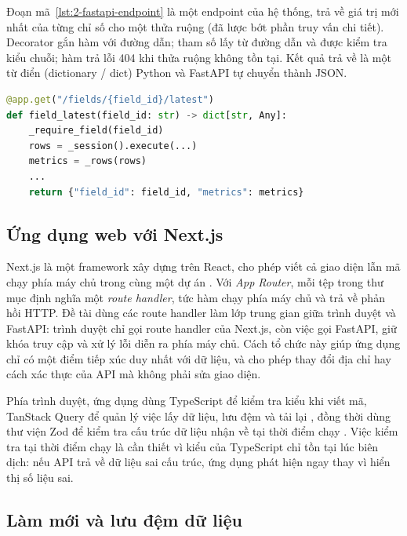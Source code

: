 Đoạn mã~\ref{lst:2-fastapi-endpoint} là một endpoint của hệ thống, trả về giá trị mới nhất của từng chỉ số cho một thửa ruộng (đã lược bớt phần truy vấn chi tiết). Decorator  gắn hàm với đường dẫn; tham số  lấy từ đường dẫn và được kiểm tra kiểu chuỗi; hàm  trả lỗi 404 khi thửa ruộng không tồn tại. Kết quả trả về là một từ điển (dictionary / dict) Python và FastAPI tự chuyển thành JSON.

\begin{lstlisting}[language=Python, caption={Endpoint trả giá trị mới nhất của một thửa ruộng (rút gọn)}, label={lst:2-fastapi-endpoint}]
@app.get("/fields/{field_id}/latest")
def field_latest(field_id: str) -> dict[str, Any]:
    _require_field(field_id)
    rows = _session().execute(...)
    metrics = _rows(rows)
    ...
    return {"field_id": field_id, "metrics": metrics}
\end{lstlisting}

\subsection{Ứng dụng web với Next.js}
\label{sec:2-nextjs}

Next.js là một framework xây dựng trên React, cho phép viết cả giao diện lẫn mã chạy phía máy chủ trong cùng một dự án \cite{nextjs_docs}. Với \emph{App Router}, mỗi tệp  trong thư mục  định nghĩa một \emph{route handler}, tức hàm chạy phía máy chủ và trả về phản hồi HTTP. Đề tài dùng các route handler làm lớp trung gian giữa trình duyệt và FastAPI: trình duyệt chỉ gọi route handler của Next.js, còn việc gọi FastAPI, giữ khóa truy cập và xử lý lỗi diễn ra phía máy chủ. Cách tổ chức này giúp ứng dụng chỉ có một điểm tiếp xúc duy nhất với dữ liệu, và cho phép thay đổi địa chỉ hay cách xác thực của API mà không phải sửa giao diện.

Phía trình duyệt, ứng dụng dùng TypeScript để kiểm tra kiểu khi viết mã, TanStack Query để quản lý việc lấy dữ liệu, lưu đệm và tải lại \cite{tanstack_query}, đồng thời dùng thư viện Zod để kiểm tra cấu trúc dữ liệu nhận về tại thời điểm chạy \cite{zod_docs}. Việc kiểm tra tại thời điểm chạy là cần thiết vì kiểu của TypeScript chỉ tồn tại lúc biên dịch: nếu API trả về dữ liệu sai cấu trúc, ứng dụng phát hiện ngay thay vì hiển thị số liệu sai.

\subsection{Làm mới và lưu đệm dữ liệu}
\label{sec:2-refresh-cache}

